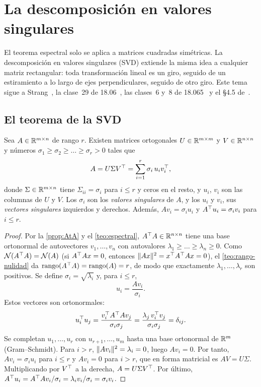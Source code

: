 \chapter{La descomposición en valores singulares}
\label{tema:4}

El teorema espectral solo se aplica a matrices cuadradas simétricas. La descomposición en valores singulares (SVD) extiende la misma idea a cualquier matriz rectangular: toda transformación lineal es un giro, seguido de un estiramiento a lo largo de ejes perpendiculares, seguido de otro giro. Este tema sigue a Strang~\cite[§7.1]{strang-ila}, la clase~29 de 18.06~\cite{mit1806}, las clases~6 y~8 de 18.065~\cite{mit18065} y el §4.5 de~\cite{mml}.

\section{El teorema de la SVD}

\begin{teorema}\label{teo:svd}
Sea $A\in\mathbb{R}^{m\times n}$ de rango $r$. Existen matrices ortogonales $U\in\mathbb{R}^{m\times m}$ y $V\in\mathbb{R}^{n\times n}$ y números $\sigma_1\ge\sigma_2\ge\dots\ge\sigma_r>0$ tales que
\[
A=U\Sigma V^{\top}=\sum_{i=1}^{r}\sigma_i\,u_iv_i^{\top},
\]
donde $\Sigma\in\mathbb{R}^{m\times n}$ tiene $\Sigma_{ii}=\sigma_i$ para $i\le r$ y ceros en el resto, y $u_i$, $v_i$ son las columnas de $U$ y $V$. Los $\sigma_i$ son los \emph{valores singulares} de $A$, y los $u_i$ y $v_i$, sus \emph{vectores singulares} izquierdos y derechos. Además, $Av_i=\sigma_iu_i$ y $A^{\top} u_i=\sigma_iv_i$ para $i\le r$.
\end{teorema}

\begin{proof}
Por la \cref{prop:AtA} y el \cref{teo:espectral}, $A^{\top} A\in\mathbb{R}^{n\times n}$ tiene una base ortonormal de autovectores $v_1,\dots,v_n$ con autovalores $\lambda_1\ge\dots\ge\lambda_n\ge 0$. Como $\mathcal{N}(A^{\top} A)=\mathcal{N}(A)$ (si $A^{\top} Ax=0$, entonces $\lVert Ax\rVert^{2}=x^{\top} A^{\top} Ax=0$), el \cref{teo:rango-nulidad} da $\operatorname{rango}(A^{\top} A)=\operatorname{rango}(A)=r$, de modo que exactamente $\lambda_1,\dots,\lambda_r$ son positivos. Se define $\sigma_i=\sqrt{\lambda_i}$ y, para $i\le r$,
\[
u_i=\frac{Av_i}{\sigma_i}.
\]
Estos vectores son ortonormales:
\[
u_i^{\top} u_j=\frac{v_i^{\top} A^{\top} Av_j}{\sigma_i\sigma_j}=\frac{\lambda_j\,v_i^{\top} v_j}{\sigma_i\sigma_j}=\delta_{ij}.
\]
Se completan $u_1,\dots,u_r$ con $u_{r+1},\dots,u_m$ hasta una base ortonormal de $\mathbb{R}^{m}$ (Gram--Schmidt). Para $i>r$, $\lVert Av_i\rVert^{2}=\lambda_i=0$, luego $Av_i=0$. Por tanto, $Av_i=\sigma_iu_i$ para $i\le r$ y $Av_i=0$ para $i>r$, que en forma matricial es $AV=U\Sigma$. Multiplicando por $V^{\top}$ a la derecha, $A=U\Sigma V^{\top}$. Por último, $A^{\top} u_i=A^{\top} Av_i/\sigma_i=\lambda_iv_i/\sigma_i=\sigma_iv_i$.
\end{proof}

